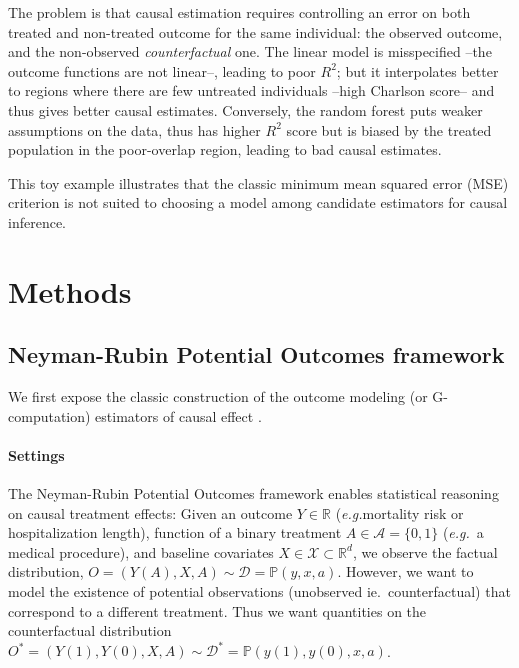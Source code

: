 \documentclass[a4paper,num-refs]{oup-contemporary}%
\newcommand{\eg}{\emph{e.g.}}
\begin{document}
The problem is that causal estimation requires controlling
an error on both treated and non-treated outcome for the same individual:
the observed outcome, and the non-observed \emph{counterfactual} one.
The linear model is misspecified --the outcome functions are not
linear--, leading to poor $R^2$; but it interpolates better to regions
where there are few untreated individuals --high Charlson score-- and
thus gives better causal estimates. Conversely, the random forest puts
weaker assumptions on the data, thus has higher $R^2$ score but is biased
by the treated population in the poor-overlap region, leading
to bad causal estimates.

This toy example illustrates that the classic minimum mean squared error (MSE)
criterion is not suited to choosing a model among candidate
estimators for causal inference.



\section{Methods}\label{sec:framework}
\subsection{Neyman-Rubin Potential Outcomes framework}%
\label{sec:neyman_rubin}%

We first expose the classic construction of the outcome modeling (or
G-computation) estimators of causal effect
\cite{robins_new_1986,snowden_implementation_2011,hernan_causal_2020}.

\paragraph{Settings}

The Neyman-Rubin Potential Outcomes framework
\cite{naimi2023defining,imbens_causal_2015} enables statistical reasoning on
causal treatment effects: Given an outcome $Y \in \mathbb R$ (\eg mortality risk
or hospitalization length), function of a binary treatment $A \in \mathcal{A} =
    \{0, 1\}$ (\eg~a medical procedure), and baseline
covariates $X \in \mathcal{X} \subset \mathbb{R}^d$, we observe the factual
distribution, $O = (Y(A), X, A) \sim \mathcal D = \mathbb P(y, x, a)$. However,
we want to model the existence of potential observations (unobserved ie.~counterfactual) that correspond to a different treatment. Thus we want
quantities on the counterfactual distribution $O^{*} = (Y(1), Y(0), X, A) \sim
    \mathcal D^{*} = \mathbb P(y(1), y(0), x, a)$.
\end{document}
